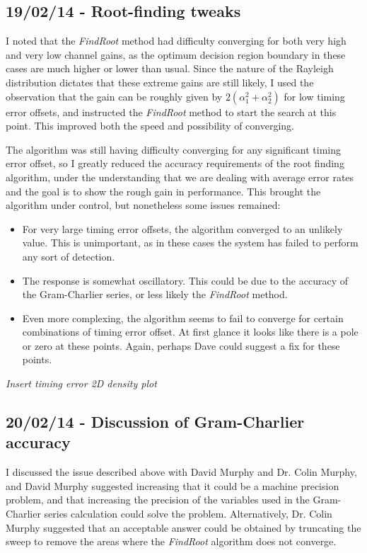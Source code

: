 \subsection{19/02/14 - Root-finding tweaks}

I noted that the \emph{FindRoot} method had difficulty converging for
both very high and very low channel gains, as the optimum decision
region boundary in these cases are much higher or lower than usual.
Since the nature of the Rayleigh distribution dictates that these
extreme gains are still likely, I used the observation that the gain can
be roughly given by $2(\alpha_1^2 + \alpha_2^2)$ for low timing error
offsets, and instructed the \emph{FindRoot} method to start the search
at this point. This improved both the speed and possibility of
converging.

The algorithm was still having difficulty converging for any significant
timing error offset, so I greatly reduced the accuracy requirements of
the root finding algorithm, under the understanding that we are dealing
with average error rates and the goal is to show the rough gain in
performance. This brought the algorithm under control, but nonetheless
some issues remained:

\begin{itemize}
\itemsep1pt\parskip0pt
\item
  For very large timing error offsets, the algorithm converged to an
  unlikely value. This is unimportant, as in these cases the system has
  failed to perform any sort of detection.
\item
  The response is somewhat oscillatory. This could be due to the
  accuracy of the Gram-Charlier series, or less likely the
  \emph{FindRoot} method.
\item
  Even more complexing, the algorithm seems to fail to converge for
  certain combinations of timing error offset. At first glance it looks
  like there is a pole or zero at these points. Again, perhaps Dave
  could suggest a fix for these points.
\end{itemize}

\emph{Insert timing error 2D density plot}

\subsection{20/02/14 - Discussion of Gram-Charlier accuracy}

I discussed the issue described above with David Murphy and Dr. Colin Murphy, and David Murphy
suggested increasing that it could be a machine precision problem, and
that increasing the precision of the variables used in the Gram-Charlier
series calculation could solve the problem. Alternatively, Dr. Colin Murphy
suggested that an acceptable answer could be obtained by truncating the
sweep to remove the areas where the \emph{FindRoot} algorithm does not
converge.

